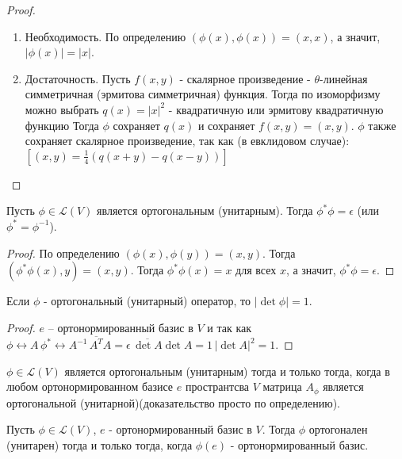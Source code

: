 \begin{proof}
    \begin{enumerate}
        \item Необходимость. По определению $(\phi(x), \phi(x)) = (x,x)$, а значит, $|\phi(x)| = |x|$.
        \item Достаточность. Пусть $f(x ,y)$ - скалярное произведение - $\theta$-линейная симметричная (эрмитова симметричная) функция. Тогда по изоморфизму можно выбрать $q(x) = |x|^2$ - 
        квадратичную или эрмитову квадратичную функцию Тогда $\phi$ сохраняет $q(x)$ и сохраняет $f(x, y) = (x, y)$. $\phi$ также сохраняет скалярное произведение, так как (в евклидовом случае): $[(x, y) = \frac{1}{4} (q(x + y) - q(x - y))]$
    \end{enumerate}
\end{proof}

\begin{proposition}
    \label{pr 13.2}
    Пусть $\phi \in \mathcal{L}(V)$ является ортогональным (унитарным). Тогда $\phi^* \phi = \epsilon$ (или $\phi^* = \phi^{-1}$).
\end{proposition}

\begin{proof}
    По определению $(\phi(x), \phi(y)) = (x, y)$. Тогда $(\phi^* \phi(x), y) = (x, y)$.
    Тогда $\phi^* \phi (x) = x$ для всех $x$, а значит, $\phi^* \phi = \epsilon$.
\end{proof}

\begin{corollary}
    Если $\phi$ - ортогональный (унитарный) оператор, то $|\det \phi| = 1$.
\end{corollary}

\begin{proof}
    $e$ -- ортонормированный базис в $V$ и так как $\phi \leftrightarrow A \, \phi^* \leftrightarrow A^{-1} \, \overline{A^T} A = \epsilon \, \overline{\det A} \det A = 1 \, |\det A|^2 = 1$.
\end{proof}

\begin{proposition}
    $\phi \in \mathcal{L}(V)$ является ортогональным (унитарным) тогда и только тогда, когда в любом ортонормированном базисе $e$ пространтсва $V$ матрица $A_\phi$ является ортогональной (унитарной)(доказательство просто по определению).
\end{proposition}

\begin{proposition}
    \label{pr 13.4}
    Пусть $\phi \in \mathcal{L}(V)$, $e$ - ортонормированный базис в $V$. Тогда $\phi$ ортогонален (унитарен) тогда и только 
    тогда, когда $\phi(e)$ - ортонормированный базис.
\end{proposition}

